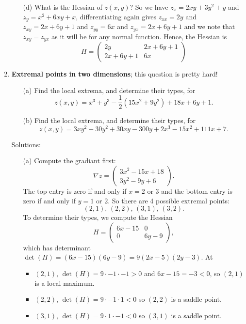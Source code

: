\documentclass[11pt,a4paper]{scrartcl}
\begin{document}
\begin{enumerate}
\begin{itemize}
        \item[(d)] What is the Hessian of $z(x,y)$? So we have $z_x=2xy+3y^2+y$ and $z_y=x^2+6xy+x$, differentiating again gives $z_{xx}=2y$ and $z_{xy}=2x+6y+1$ and $z_{yy}=6x$ and $z_{yx}=2x+6y+1$ and we note that $z_{xy}=z_{yx}$ as it will be for any normal function. Hence, the Hessian is
          \begin{equation}
            H=\left(\begin{array}{cc}2y&2x+6y+1\\2x+6y+1&6x\end{array}\right)
          \end{equation}
\end{itemize}

	
	\item \textbf{Extremal points in two dimensions}; this question is pretty hard!
	\begin{itemize}
		\item[(a)] Find the local extrema, and determine their types, for
		  \[z(x,y) = x^3 + y^3 - \frac{1}{2}(15x^2 + 9y^2) + 18x + 6y + 1.\]
		\item[(b)] Find the local extrema, and determine their types, for
		\[z(x,y) = 3xy^2 - 30y^2 + 30xy - 300y + 2x^3 - 15x^2 + 111x + 7.\]
	\end{itemize}
	Solutions:
	\begin{itemize}
		\item[(a)] Compute the gradiant first:
		\[\nabla z = \left(\begin{array}{c}
			3x^2 - 15x + 18 \\
			3y^2 - 9y + 6
		\end{array}\right).\]
		The top entry is zero if and only if $x = 2$ or 3 and the bottom entry is 
		zero if and only if $y = 1$ or 2.
		So there are 4 possible extremal points:
		\[(2,1),\, (2,2),\, (3,1),\, (3,2).\]
		To determine their types, we compute the Hessian
		\[H = \left(\begin{array}{cc}
		6x - 15 & 0 \\
		0 & 6y - 9
		\end{array}\right),\]
		which has determinant $\det(H) = (6x-15)(6y-9) = 9(2x-5)(2y-3)$.
		At
		\begin{itemize}
			\item $(2,1)$, $\det(H) = 9\cdot -1 \cdot -1 > 0$ and $6x - 15 = -3 < 0$, so
			$(2,1)$ is a local maximum.
			\item $(2,2)$, $\det(H) = 9\cdot -1 \cdot 1 < 0$ so $(2,2)$ is a saddle point.
			\item $(3,1)$, $\det(H) = 9\cdot 1 \cdot -1 < 0$ so $(3,1)$ is a saddle point.

\end{itemize}
\end{itemize}
\end{enumerate}
\end{document}

